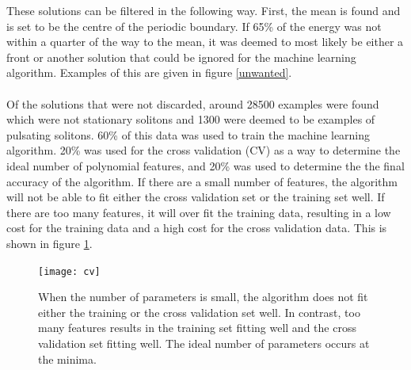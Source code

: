 \documentclass[a4paper,12pt]{report}
\begin{document}
These solutions can be filtered in the following way. First, the mean is found and is set to be the centre of the periodic boundary. If 65\% of the energy was not within a quarter of the way to the mean, it was deemed to most likely be either a front or another solution that could be ignored for the machine learning algorithm. Examples of this are given in figure \ref{unwanted}. 
\\
\\
Of the solutions that were not discarded, around 28500 examples were found which were not stationary solitons and 1300 were deemed to be examples of pulsating solitons. 
60\% of this data was used to train the machine learning algorithm. 20\% was used for the cross validation (CV) as a way to determine the ideal number of polynomial features, and 20\% was used to determine the the final accuracy of the algorithm. If there are a small number of features, the algorithm will not be able to fit either the cross validation set or the training set well. If there are too many features, it will over fit the training data, resulting in a low cost for the training data and a high cost for the cross validation data. This is shown in figure \ref{cv}.

\begin{figure}[h]
\centering
\texttt{[image: cv]}
\caption{When the number of parameters is small, the algorithm does not fit either the training or the cross validation set well. In contrast, too many features results in the training set fitting well and the cross validation set fitting well. The ideal number of parameters occurs at the minima.}
\label{cv} 
\end{figure} 
\end{document}
